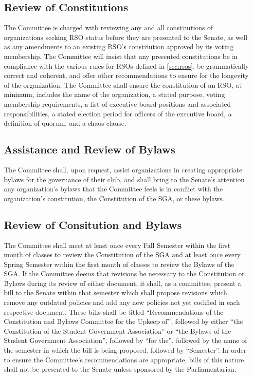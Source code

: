 \documentclass[12pt]{scrreprt}
\begin{document}
\subsection{Review of Constitutions}
The Committee is charged with reviewing any and all constitutions of organizations seeking RSO status before they are presented to the Senate, as well as any amendments to an existing RSO’s constitution approved by its voting membership. The Committee will insist that any presented constitutions be in compliance with the various rules for RSOs defined in 
\ref{sec:rsos}, be grammatically correct and coherent, and offer other recommendations to ensure for the longevity of the organization. The Committee shall ensure the constitution of an RSO, at minimum, includes the name of the organization, a stated purpose, voting membership requirements, a list of executive board positions and associated responsibilities, a stated election period for officers of the executive board, a definition of quorum, and a chaos clause.

\subsection{Assistance and Review of Bylaws}
The Committee shall, upon request, assist organizations in creating appropriate bylaws for 
the governance of their club, and shall bring to the Senate's attention any 
organization's bylaws that the Committee feels is in conflict with the 
organization's constitution, the Constitution of the SGA, or these bylaws.

\subsection{Review of Consitution and Bylaws}
The Committee shall meet at least once every Fall Semester within the first month of classes to review the Constitution of the SGA and at least once every Spring Semester within the first month of classes to review the Bylaws of the SGA. If the Committee deems that revisions be necessary to the Constitution or Bylaws during its review of either document, it shall, as a committee, present a bill to the Senate within that semester which shall propose revisions which remove any outdated policies and add any new policies not yet codified in each respective document. These bills shall be titled “Recommendations of the Constitution and Bylaws Committee for the Upkeep of”, followed by either “the Constitution of the Student Government Association” or “the Bylaws of the Student Government Association”, followed by “for the”, followed by the name of the semester in which the bill is being proposed, followed by “Semester”. In order to ensure the Committee’s recommendations are appropriate, bills of this nature shall not be presented to the Senate unless sponsored by the Parliamentarian.
\end{document}
